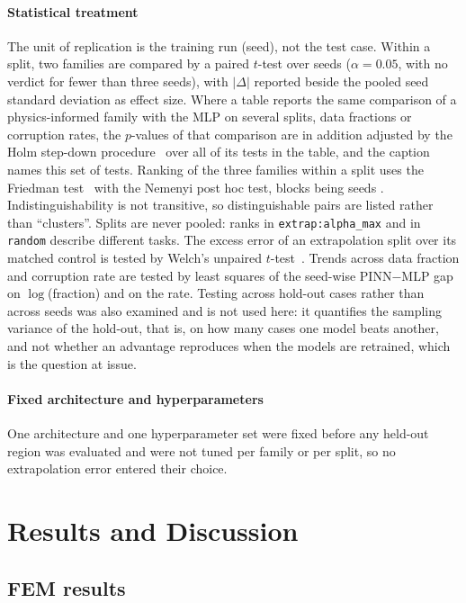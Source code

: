\documentclass[pdflatex,sn-basic,Numbered]{sn-jnl}
\begin{document}
\paragraph{Statistical treatment}
The unit of replication is the training run (seed), not the test case. Within a
split, two families are compared by a paired $t$-test over seeds ($\alpha=0.05$,
with no verdict for fewer than three seeds), with $|\Delta|$ reported beside the pooled
seed standard deviation as effect size.
Where a table reports the same comparison of a physics-informed family with the MLP
on several splits, data fractions or corruption rates, the $p$-values of that comparison
are in addition adjusted by the Holm step-down procedure~\citep{holm1979} over all of its
tests in the table, and the caption names this set of tests.
Ranking of the three families within a split uses the Friedman
test~\citep{friedman1937} with the Nemenyi post hoc test, blocks being seeds
\citep{demsar2006}. Indistinguishability is not
transitive, so distinguishable pairs are listed rather than ``clusters''.
Splits are never pooled: ranks in \texttt{extrap:alpha\_max} and in
\texttt{random} describe different tasks.
The excess error of an extrapolation split over its matched control is tested by
Welch's unpaired $t$-test~\citep{welch1947}. Trends across data fraction and corruption rate are tested by
least squares of the seed-wise PINN$-$MLP gap on $\log$(fraction) and on the rate.
Testing across hold-out cases rather than across seeds was also examined and is not used here:
it quantifies the sampling variance of the hold-out, that is, on how many cases one model beats
another, and not whether an advantage reproduces when the models are retrained, which is the
question at issue.

\paragraph{Fixed architecture and hyperparameters}
One architecture and one hyperparameter set were fixed before any held-out
region was evaluated and were not tuned per family or per split, so no
extrapolation error entered their choice.

\section{Results and Discussion}

\subsection{FEM results}
\label{sec:res_fem_verification}
\end{document}
